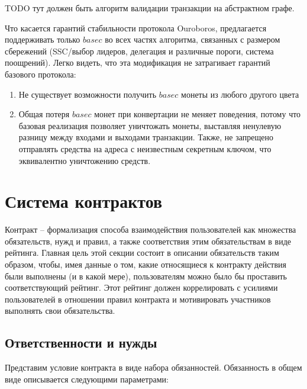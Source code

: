 \documentclass[]{itmo-student-thesis}
\begin{document}
TODO тут должен быть алгоритм валидации транзакции на абстрактном графе.

Что касается гарантий стабильности протокола Ouroboros, предлагается
поддерживать только $basec$ во всех частях алгоритма, связанных с
размером сбережений (SSC/выбор лидеров, делегация и различные пороги,
система поощрений). Легко видеть, что эта модификация не затрагивает
гарантий базового протокола:
\begin{enumerate}
\item Не существует возможности получить $basec$ монеты из любого
  другого цвета
\item Общая потеря $basec$ монет при конвертации не меняет поведения,
  потому что базовая реализация позволяет уничтожать монеты, выставляя
  ненулевую разницу между входами и выходами транзакции. Также, не
  запрещено отправлять средства на адреса с неизвестным секретным
  ключом, что эквивалентно уничтожению средств.
\end{enumerate}

\section{Система контрактов}

Контракт -- формализация способа взаимодействия пользователей как
множества обязательств, нужд и правил, а также соответствия этим
обязательствам в виде рейтинга. Главная цель этой секции состоит в
описании обязательств таким образом, чтобы, имея данные о том, какие
относящиеся к контракту действия были выполнены (и в какой мере),
пользователям можно было бы проставить соответствующий рейтинг. Этот
рейтинг должен коррелировать с усилиями пользователей в отношении
правил контракта и мотивировать участников выполнять свои
обязательства.

\subsection{Ответственности и нужды}

Представим условие контракта в виде набора обязанностей. Обязанность в
общем виде описывается следующими параметрами:
\end{document}
